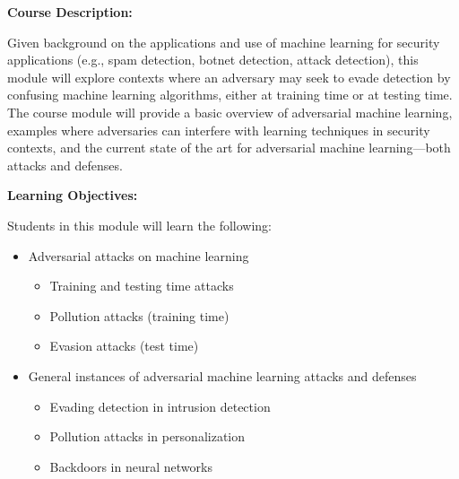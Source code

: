 \documentclass[12pt]{article}
\renewcommand{\_}{\kern-1.5pt\textunderscore\kern-1.5pt}
\begin{document}


\vspace{\baselineskip}

\vspace{\baselineskip}
\textbf{Course Description:}\par


\vspace{\baselineskip}
Given background on the applications and use of machine learning for security applications (e.g., spam detection, botnet detection, attack detection), this module will explore contexts where an adversary may seek to evade detection by confusing machine learning algorithms, either at training time or at testing time. The course module will provide a basic overview of adversarial machine learning, examples where adversaries can interfere with learning techniques in security contexts, and the current state of the art for adversarial machine learning—both attacks and defenses.\par


\vspace{\baselineskip}
\textbf{Learning Objectives:}\par


\vspace{\baselineskip}
Students in this module will learn the following:\par

\begin{itemize}
	\item Adversarial attacks on machine learning\par

\begin{itemize}
	\item Training and testing time attacks\par

	\item Pollution attacks (training time)\par

	\item Evasion attacks (test time)\par


\end{itemize}
	\item General instances of adversarial machine learning attacks and defenses\par

\begin{itemize}
	\item Evading detection in intrusion detection\par

	\item Pollution attacks in personalization\par

	\item Backdoors in neural networks
\end{itemize}
\end{itemize}\par
\end{document}
